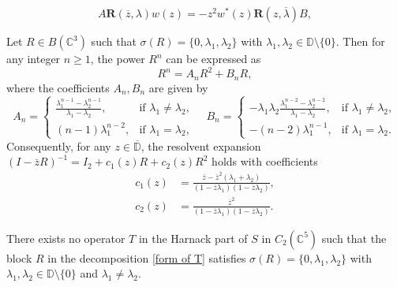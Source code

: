 \documentclass[10pt,a4paper]{amsart}
\begin{document}
	\begin{equation}\label{eqfour}
		A \mathbf{R}(\overline{z}, \lambda) w(z) = -z^2 w^*(z) \mathbf{R}(z, \overline{\lambda}) B,
	\end{equation}

\begin{lemma}\label{lemma:Rn_unified}
	Let $R \in B(\mathbb{C}^3)$ such that $\sigma(R)=\{0, \lambda_1, \lambda_2\}$ with $\lambda_1, \lambda_2 \in \mathbb{D} \setminus \{0\}$. Then for any integer $n \geq 1$, the power $R^n$ can be expressed as
	\begin{equation}\label{eq:Rn_unified}
		R^n = A_n R^2 + B_n R,
	\end{equation}
	where the coefficients $A_n, B_n$ are given by
	\begin{equation}\label{eq:AnBn_unified}
		A_n = \begin{cases} 
			\displaystyle \frac{\lambda_1^{n-1} - \lambda_2^{n-1}}{\lambda_1 - \lambda_2}, & \text{if } \lambda_1 \neq \lambda_2, \\[10pt]
			(n-1)\lambda_1^{n-2}, & \text{if } \lambda_1 = \lambda_2,
		\end{cases}
		\quad 
		B_n = \begin{cases} 
			\displaystyle -\lambda_1 \lambda_2 \frac{\lambda_1^{n-2} - \lambda_2^{n-2}}{\lambda_1 - \lambda_2}, & \text{if } \lambda_1 \neq \lambda_2, \\[10pt]
			-(n-2)\lambda_1^{n-1}, & \text{if } \lambda_1 = \lambda_2.
		\end{cases}
	\end{equation}
	Consequently, for any $z \in \overline{\mathbb{D}}$, the resolvent expansion $(I-\overline{z}R)^{-1} = I_2 + c_1(z)R + c_2(z)R^2$ holds with coefficients
	\begin{align}
		c_1(z) &= \frac{\overline{z} - \overline{z}^2(\lambda_1 + \lambda_2)}{(1-\overline{z}\lambda_1)(1-\overline{z}\lambda_2)}, \label{c1} \\
		c_2(z) &= \frac{\overline{z}^2}{(1-\overline{z}\lambda_1)(1-\overline{z}\lambda_2)}. \label{c2}
	\end{align}
\end{lemma}

\begin{proposition}\label{Prop:case2}
	There exists no operator $T$ in the Harnack part of $S$ in $C_2(\mathbb{C}^{5})$ such that the block $R$ in the decomposition \eqref{form of T} satisfies $\sigma(R)=\{0, \lambda_1, \lambda_2\}$ with $\lambda_1, \lambda_2 \in \mathbb{D} \setminus \{0\}$ and $\lambda_1 \neq \lambda_2$.
\end{proposition}
\end{document}
